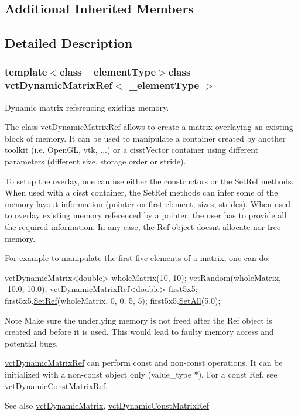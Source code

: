 \subsection*{Additional Inherited Members}


\subsection{Detailed Description}
\subsubsection*{template$<$class \+\_\+element\+Type$>$class vct\+Dynamic\+Matrix\+Ref$<$ \+\_\+element\+Type $>$}

Dynamic matrix referencing existing memory. 

The class \hyperlink{classvct_dynamic_matrix_ref}{vct\+Dynamic\+Matrix\+Ref} allows to create a matrix overlaying an existing block of memory. It can be used to manipulate a container created by another toolkit (i.\+e. Open\+G\+L, vtk, ...) or a cisst\+Vector container using different parameters (different size, storage order or stride).

To setup the overlay, one can use either the constructors or the Set\+Ref methods. When used with a cisst container, the Set\+Ref methods can infer some of the memory layout information (pointer on first element, sizes, strides). When used to overlay existing memory referenced by a pointer, the user has to provide all the required information. In any case, the Ref object doesn\textquotesingle{}t allocate nor free memory.

For example to manipulate the first five elements of a matrix, one can do\+: 
\begin{DoxyCode}
\hyperlink{classvct_dynamic_matrix}{vctDynamicMatrix<double>} wholeMatrix(10, 10);
\hyperlink{group__cisst_vector_ga0d25660a2dc6ef9c093f6f6b2804d2d0}{vctRandom}(wholeMatrix, -10.0, 10.0);
\hyperlink{classvct_dynamic_matrix_ref}{vctDynamicMatrixRef<double>} first5x5;
first5x5.\hyperlink{classvct_dynamic_matrix_ref_a99a2f5a8b4b5f45ce180d5075dd70311}{SetRef}(wholeMatrix, 0, 0, 5, 5);
first5x5.\hyperlink{classvct_dynamic_matrix_base_ad7e53be82e28a75b78ed3bd8e4923035}{SetAll}(5.0);
\end{DoxyCode}


\begin{DoxyNote}{Note}
Make sure the underlying memory is not freed after the Ref object is created and before it is used. This would lead to faulty memory access and potential bugs.

\hyperlink{classvct_dynamic_matrix_ref}{vct\+Dynamic\+Matrix\+Ref} can perform const and non-\/const operations. It can be initialized with a non-\/const object only ({\ttfamily value\+\_\+type $\ast$}). For a const Ref, see \hyperlink{classvct_dynamic_const_matrix_ref}{vct\+Dynamic\+Const\+Matrix\+Ref}.
\end{DoxyNote}
\begin{DoxySeeAlso}{See also}
\hyperlink{classvct_dynamic_matrix}{vct\+Dynamic\+Matrix}, \hyperlink{classvct_dynamic_const_matrix_ref}{vct\+Dynamic\+Const\+Matrix\+Ref}
\end{DoxySeeAlso}

